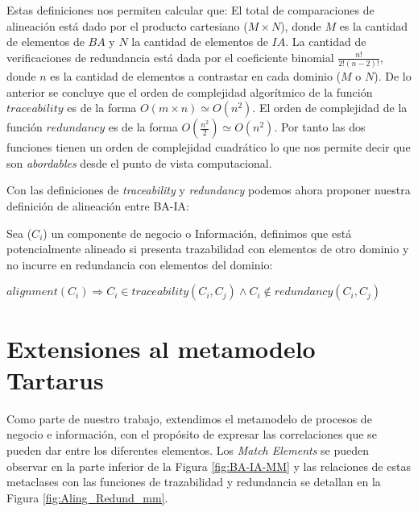 Estas definiciones nos permiten calcular que: El total de comparaciones de alineaci\'on est\'a dado por el producto cartesiano ($M \times N$), donde $M$ es la cantidad de elementos de $BA$ y $N$ la cantidad de elementos de $IA$. La cantidad de verificaciones de redundancia est\'a dada por el coeficiente binomial $\frac{{n!}}{2!(n-2)!}$, donde $n$ es la cantidad de elementos a contrastar en cada dominio ($M$ o $N$). De lo anterior se concluye que el orden de complejidad algor\'itmico de la funci\'on $traceability$ es de la forma $O(m \times n)\simeq O(n^2)$. El orden de complejidad de la funci\'on $redundancy$ es de la forma $O(\frac{n^2}{2}) \simeq O(n^2)$. Por tanto las dos funciones tienen un orden de complejidad cuadr\'atico lo que nos permite decir que son \textit{abordables} desde el punto de vista computacional.

Con las definiciones de \textit{traceability} y \textit{redundancy} podemos ahora proponer nuestra definici\'on de alineaci\'on entre BA-IA:

\begin{theorem}

\label{def:alignment}
Sea ($C_{i}$) un componente de negocio o Informaci\'on, definimos que est\'a potencialmente alineado si presenta trazabilidad con  elementos de otro dominio y no incurre en redundancia con elementos del dominio:
\begin{center}
\begin{math}
alignment(C_{i}) \Longrightarrow C_{i} \in traceability(C_{i},C_{j}) \wedge C_{i} \notin redundancy(C_{i},C_{j})
\end{math}
\end{center}
\end{theorem}


\section{Extensiones al metamodelo Tartarus}

Como parte de nuestro trabajo, extendimos el metamodelo de procesos de negocio e informaci\'on, con el prop\'osito de expresar las correlaciones que se pueden dar entre los diferentes elementos. Los \textit{Match Elements} se pueden observar en la parte inferior de la Figura \ref{fig:BA-IA-MM} y las relaciones de estas metaclases con las funciones de trazabilidad y redundancia se detallan en la Figura \ref{fig:Aling_Redund_mm}.

